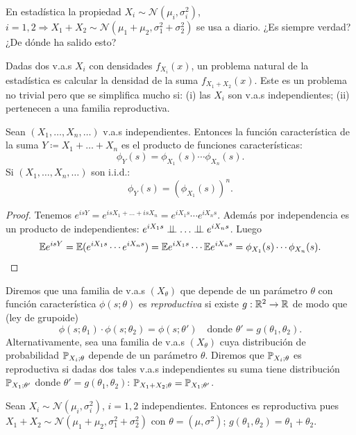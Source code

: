En estadística la propiedad $X_i \sim \mathcal{N}(\mu_i, \sigma_i^2)$, $i=1,2 \Rightarrow X_1 + X_2 \sim \mathcal{N}(\mu_1 + \mu_2, \sigma_1^2 + \sigma_2^2)$ se usa a diario. ¿Es siempre verdad? ¿De dónde ha salido esto?

Dadas dos v.a.s $X_i$ con densidades $f_{X_i}(x)$, un problema natural de la estadística es calcular la densidad de la suma $f_{X_1 + X_2}(x)$. Este es un problema no trivial pero que se simplifica mucho si: (i) las $X_i$ son v.a.s independientes; (ii) pertenecen a una familia reproductiva.

\begin{teorema}[9]
Sean $(X_1, \dots, X_n, \dots)$ v.a.s independientes. Entonces la función característica de la suma $Y \coloneqq X_1 + \dots + X_n$ es el producto de funciones características:
\[
  \phi_Y(s) = \phi_{X_1}(s) \cdots \phi_{X_n}(s).
\]
Si $(X_1, \dots, X_n, \dots)$ son i.i.d.:
\[
  \phi_Y(s) = (\phi_{X_1}(s))^n.
\]
\end{teorema}

\begin{proof}
Tenemos $e^{isY} = e^{isX_1 + \dots + isX_n} = e^{iX_1 s} \cdots e^{iX_n s}$. Además por independencia es un producto de independientes: $e^{iX_1 s} \indep \dots \indep e^{iX_n s}$. Luego
\[
  \mathbb{E} e^{isY} = \mathbb{E}(e^{iX_1 s} \cdots e^{iX_n s}) = \mathbb{E} e^{iX_1 s} \cdots \mathbb{E} e^{iX_n s} = \phi_{X_1}(s) \cdots \phi_{X_n}(s).
\]
\end{proof}
\textcolor{azulresalt}{
\begin{definicion}[27 — Reproductividad]
Diremos que una familia de v.a.s $(X_\theta)$ que depende de un parámetro $\theta$ con función característica $\phi(s; \theta)$ es \emph{reproductiva} si existe $g : \mathbb{R}^2 \to \mathbb{R}$ de modo que (ley de grupoide)
\[
  \phi(s; \theta_1) \cdot \phi(s; \theta_2) = \phi(s; \theta') \quad \text{donde } \theta' = g(\theta_1, \theta_2).
\]
Alternativamente, sea una familia de v.a.s $(X_\theta)$ cuya distribución de probabilidad $\mathbb{P}_{X_i; \theta}$ depende de un parámetro $\theta$. Diremos que $\mathbb{P}_{X_i; \theta}$ es reproductiva si dadas dos tales v.a.s independientes su suma tiene distribución $\mathbb{P}_{X_1; \theta'}$ donde $\theta' = g(\theta_1, \theta_2)$: $\mathbb{P}_{X_1 + X_2; \theta} = \mathbb{P}_{X_1; \theta'}$.
\end{definicion}}

\textcolor{azulresalt}{
\begin{ejemplo}[9]
Sean $X_i \sim \mathcal{N}(\mu_i, \sigma_i^2)$, $i=1,2$ independientes. Entonces es reproductiva pues $X_1 + X_2 \sim \mathcal{N}(\mu_1 + \mu_2, \sigma_1^2 + \sigma_2^2)$ con $\theta = (\mu, \sigma^2)$; $g(\theta_1, \theta_2) = \theta_1 + \theta_2$.
\end{ejemplo}}

